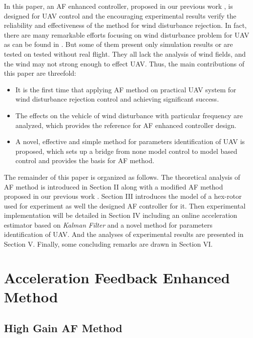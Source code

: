 \documentclass[letterpaper, 10 pt, conference]{ieeeconf}  %
\begin{document}
In this paper, an AF enhanced controller, proposed in our previous work \cite{He2010}, is designed for UAV control and the encouraging experimental results verify the reliability and effectiveness of the method for wind disturbance rejection.
In fact, there are many remarkable efforts focusing on wind disturbance problem for UAV as can be found in \cite{Tomic2014,Escareno2013,Lee2016,Cabecinhas2015,Leonard2012}. But some of them present only simulation results or are tested on tested without real flight.
They all lack the analysis of wind fields, and the wind may not strong enough to effect UAV.
Thus, the main contributions of this paper are threefold:

\begin{itemize}
    \item It is the first time that applying AF method on practical UAV system for wind disturbance rejection control and achieving significant success.
    \item The effects on the vehicle of wind disturbance with particular frequency are analyzed, which provides the reference for AF enhanced controller design.
    \item A novel, effective and simple method for parameters identification of UAV is proposed, which sets up a bridge from none model control to model based control and provides the basis for AF method.
\end{itemize}

The remainder of this paper is organized as follows. The theoretical analysis of AF method is introduced in Section II along with a modified AF method proposed in our previous work \cite{He2010}.
Section III introduces the model of a hex-rotor used for experiment as well the designed AF controller for it.
Then experimental implementation will be detailed in Section IV including an online acceleration estimator based on \textsl{Kalman Filter} and a novel method for parameters identification of UAV.
And the analyses of experimental results are presented in Section V.
Finally, some concluding remarks are drawn in Section VI.

\section{Acceleration Feedback Enhanced Method}

\subsection{High Gain AF Method}
\end{document}
